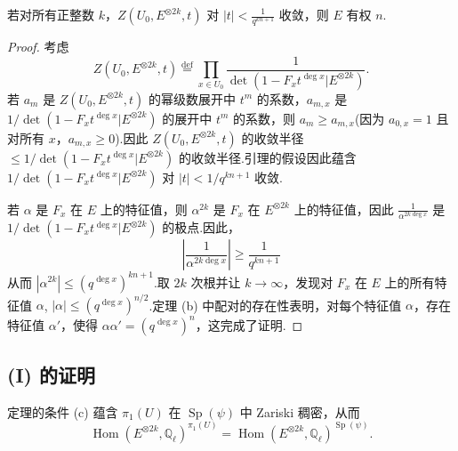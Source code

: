\begin{lemma}\label{lem:30.9}
若对所有正整数 $k$，$Z(U_0, E^{\otimes 2k}, t)$ 对 $|t| < \frac{1}{q^{kn+1}}$ 收敛，则 $E$ 有权 $n$.
\end{lemma}

\begin{proof}
考虑
\[
Z(U_0, E^{\otimes 2k}, t) \overset{\mathrm{def}}{=} \prod_{x \in U_0} \frac{1}{\det(1 - F_x t^{\deg x}|E^{\otimes 2k})}.
\]
若 $a_m$ 是 $Z(U_0, E^{\otimes 2k}, t)$ 的幂级数展开中 $t^{m}$ 的系数，$a_{m, x}$ 是 $1/\det(1 - F_x t^{\deg x}|E^{\otimes 2k})$ 的展开中 $t^{m}$ 的系数，则 $a_m \geq a_{m, x}$(因为 $a_{0, x} = 1$ 且对所有 $x$，$a_{m, x} \geq 0$).因此 $Z(U_0, E^{\otimes 2k}, t)$ 的收敛半径 $\leq 1/\det(1 - F_x t^{\deg x}|E^{\otimes 2k})$ 的收敛半径.引理的假设因此蕴含 $1/\det(1 - F_x t^{\deg x}|E^{\otimes 2k})$ 对 $|t| < 1/q^{kn+1}$ 收敛.

若 $\alpha$ 是 $F_x$ 在 $E$ 上的特征值，则 $\alpha^{2k}$ 是 $F_x$ 在 $E^{\otimes 2k}$ 上的特征值，因此 $\frac{1}{\alpha^{2k\deg x}}$ 是 $1/\det(1 - F_x t^{\deg x}|E^{\otimes 2k})$ 的极点.因此，
\[
\left| \frac{1}{\alpha^{2k\deg x}} \right| \geq \frac{1}{q^{kn+1}}
\]
从而 $|\alpha^{2k}| \leq (q^{\deg x})^{kn+1}$.取 $2k$ 次根并让 $k \to \infty$，发现对 $F_x$ 在 $E$ 上的所有特征值 $\alpha$, $|\alpha| \leq (q^{\deg x})^{n/2}$.定理 (b) 中配对的存在性表明，对每个特征值 $\alpha$，存在特征值 $\alpha'$，使得 $\alpha\alpha' = (q^{\deg x})^{n}$，这完成了证明.
\end{proof}

\subsection*{(I) 的证明}

\begin{lemma}\label{lem:30.10}
定理的条件 (c) 蕴含 $\pi_1(U)$ 在 $\operatorname{Sp}(\psi)$ 中 Zariski 稠密，从而
\[
\operatorname{Hom}(E^{\otimes 2k}, \mathbb{Q}_{\ell})^{\pi_1(U)} = \operatorname{Hom}(E^{\otimes 2k}, \mathbb{Q}_{\ell})^{\operatorname{Sp}(\psi)}.
\]
\end{lemma}

